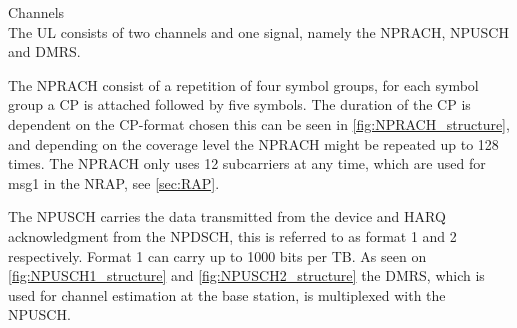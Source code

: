 Channels\\
The \gls{UL} consists of two channels and one signal, namely the \gls{NPRACH}, \gls{NPUSCH} and \gls{DMRS}.

The \gls{NPRACH} consist of a repetition of four symbol groups, for each symbol group a \gls{CP} is attached followed by five symbols. The duration of the CP is dependent on the CP-format chosen this can be seen in \autoref{fig:NPRACH_structure}, and depending on the coverage level the \gls{NPRACH} might be repeated up to 128 times. The NPRACH only uses 12 subcarriers at any time, which are used for msg1 in the \gls{NRAP}, see \autoref{sec:RAP}. \citep{NB-IoT_Book}

The \gls{NPUSCH} carries the data transmitted from the device and \gls{HARQ} acknowledgment from the \gls{NPDSCH}, this is referred to as format 1 and 2 respectively. Format 1 can carry up to 1000 bits per \gls{TB}. As seen on \autoref{fig:NPUSCH1_structure} and \autoref{fig:NPUSCH2_structure} the DMRS, which is used for channel estimation at the base station, is multiplexed with the NPUSCH. 



